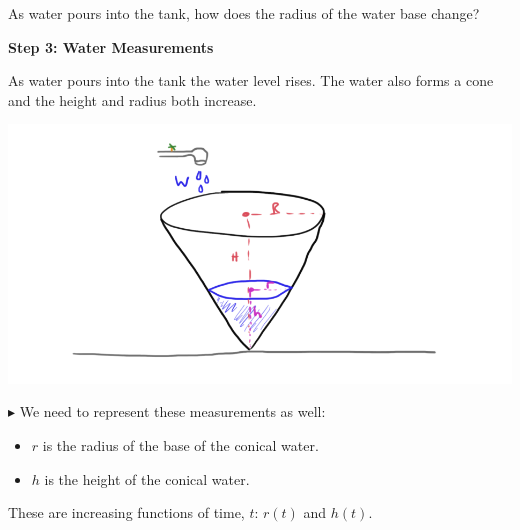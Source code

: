 \documentclass{ximera}
\begin{document}
\begin{question} 


As water pours into the tank, how does the radius of the water base change?

\begin{multipleChoice}
\end{multipleChoice}

\end{question}









\textbf{\textcolor{purple!85!blue}{Step 3: Water Measurements}}


As water pours into the tank the water level rises.  The water also forms a cone and the height and radius both increase.  








\begin{image}
\includegraphics{pics/cone_4.png}
\end{image}





$\blacktriangleright$ We need to represent these measurements as well:

\begin{itemize}
\item $r$ is the radius of the base of the conical water.
\item $h$ is the height of the conical water.
\end{itemize}

These are increasing functions of time, $t$: $r(t)$ and $h(t)$.
\end{document}
